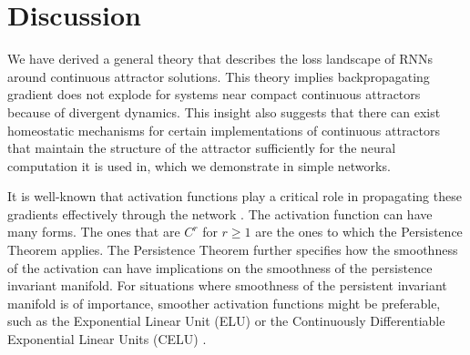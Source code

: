 \documentclass{article} %
\newcounter{ct}
\theoremstyle{definition}
\theoremstyle{remark}
\begin{document}
\section{Discussion}
We have derived a general theory that describes the loss landscape of RNNs around continuous attractor solutions.
This theory implies backpropagating gradient does not explode for systems near compact continuous attractors because of divergent dynamics.
This insight also suggests that there can exist homeostatic mechanisms for certain implementations of continuous attractors that maintain the structure of the attractor sufficiently for the neural computation it is used in, which we demonstrate in simple networks.

It is well-known that activation functions play a critical role in propagating these gradients effectively through the network  \citep{jagtap2023, ramachandran2017, hayou2019}.
The activation function can have many forms.
The ones that are $C^r$ for $r\geq 1$ are the ones to which the Persistence Theorem applies. 
The Persistence Theorem further specifies how the smoothness of the activation can have implications on the smoothness of the persistence invariant manifold.
For situations where smoothness of the persistent invariant manifold is of importance, smoother activation functions might be preferable, such as the Exponential Linear Unit (ELU)\citep{clevert2015} or the Continuously Differentiable Exponential Linear Units (CELU) \citep{barron2017}.





%
%


\end{document}
